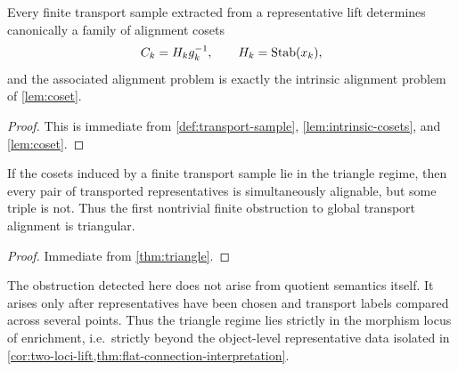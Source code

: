 \begin{proposition}
	Every finite transport sample extracted from a representative lift
	determines canonically a family of alignment cosets
	\[
		C_k=H_k g_k^{-1},
		\qquad
		H_k=\operatorname{Stab}(x_k),
	\]
	and the associated alignment problem is exactly the intrinsic alignment
	problem of \cref{lem:coset}.
\end{proposition}
\begin{proof}
	This is immediate from \cref{def:transport-sample},
	\cref{lem:intrinsic-cosets}, and \cref{lem:coset}.
\end{proof}
\begin{corollary}
	If the cosets induced by a finite transport sample lie in the triangle
	regime, then every pair of transported representatives is
	simultaneously alignable, but some triple is not.
	Thus the first nontrivial finite obstruction to global transport
	alignment is triangular.
\end{corollary}
\begin{proof}
	Immediate from \cref{thm:triangle}.
\end{proof}
\begin{remark}
	The obstruction detected here does not arise from quotient semantics
	itself. It arises only after representatives have been chosen and
	transport labels compared across several points. Thus the triangle
	regime lies strictly in the morphism locus of enrichment, i.e.\
	strictly beyond the object-level representative data isolated in
	\cref{cor:two-loci-lift,thm:flat-connection-interpretation}.
\end{remark}
